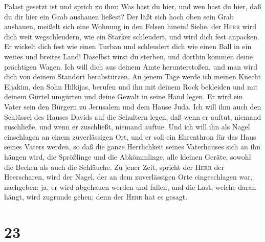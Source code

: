 Palast gesetzt ist und sprich zu ihm:  Was hast du hier,
und wen hast du hier, daß du dir hier ein Grab aushauen ließest? Der
läßt sich hoch oben sein Grab aushauen, meißelt sich eine Wohnung in den
Felsen hinein!  Siehe, der \textsc{Herr} wird dich weit
wegschleudern, wie ein Starker schleudert, und wird dich fest anpacken.
 Er wickelt dich fest wie einen Turban und schleudert
dich wie einen Ball in ein weites und breites Land! Daselbst wirst du
sterben, und dorthin kommen deine prächtigen Wagen.  Ich
will dich aus deinem Amte herunterstoßen, und man wird dich von deinem
Standort herabstürzen.  An jenem Tage werde ich meinen
Knecht Eljakim, den Sohn Hilkijas, berufen  und ihn mit
deinem Rock bekleiden und mit deinem Gürtel umgürten und deine Gewalt in
seine Hand legen. Er wird ein Vater sein den Bürgern zu Jerusalem und
dem Hause Juda.  Ich will ihm auch den Schlüssel des
Hauses Davids auf die Schultern legen, daß wenn er auftut, niemand
zuschließe, und wenn er zuschließt, niemand auftue.  Und
ich will ihn als Nagel einschlagen an einem zuverlässigen Ort, und er
soll ein Ehrenthron für das Haus seines Vaters werden, 
so daß die ganze Herrlichkeit seines Vaterhauses sich an ihn hängen
wird, die Sprößlinge und die Abkömmlinge, alle kleinen Geräte, sowohl
die Becken als auch die Schläuche.  Zu jener Zeit,
spricht der \textsc{Herr} der Heerscharen, wird der Nagel, der an dem
zuverlässigen Orte eingeschlagen war, nachgeben; ja, er wird abgehauen
werden und fallen, und die Last, welche daran hängt, wird zugrunde
gehen; denn der \textsc{Herr} hat es gesagt.

\hypertarget{section-22}{%
\section{23}\label{section-22}}

